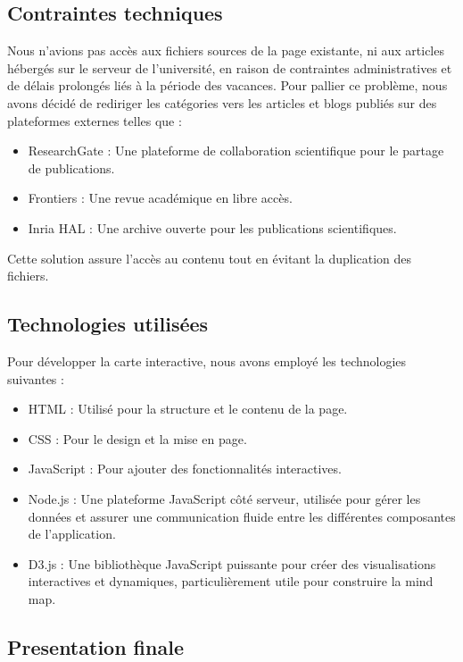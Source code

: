 \documentclass{article}
\begin{document}
\subsection{Contraintes techniques}

Nous n’avions pas accès aux fichiers sources de la page existante, ni aux articles hébergés sur le serveur de l’université, en raison de contraintes administratives et de délais prolongés liés à la période des vacances. Pour pallier ce problème, nous avons décidé de rediriger les catégories vers les articles et blogs publiés sur des plateformes externes telles que :

\begin{itemize}
    \item ResearchGate : Une plateforme de collaboration scientifique pour le partage de publications.
    \item Frontiers : Une revue académique en libre accès.
    \item Inria HAL : Une archive ouverte pour les publications scientifiques.
\end{itemize}

Cette solution assure l’accès au contenu tout en évitant la duplication des fichiers.


\subsection{Technologies utilisées}
Pour développer la carte interactive, nous avons employé les technologies suivantes :

\begin{itemize}
    \item HTML : Utilisé pour la structure et le contenu de la page.
    \item CSS : Pour le design et la mise en page.
    \item JavaScript : Pour ajouter des fonctionnalités interactives.
    \item Node.js : Une plateforme JavaScript côté serveur, utilisée pour gérer les données et assurer une communication fluide entre les différentes composantes de l’application.
    \item D3.js : Une bibliothèque JavaScript puissante pour créer des visualisations interactives et dynamiques, particulièrement utile pour construire la mind map.
\end{itemize}

\subsection{Presentation finale}
\end{document}
